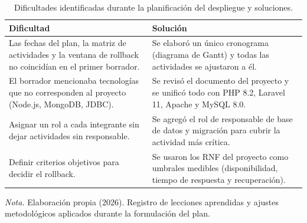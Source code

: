 \begin{table}[H]
  \centering
  \caption{Dificultades identificadas durante la planificación del despliegue y soluciones.}
  \label{tab:despliegue_dificultades}
  \begin{tabularx}{\linewidth}{|>{\raggedright\arraybackslash}X|>{\raggedright\arraybackslash}X|}
    \hline
    \textbf{Dificultad} & \textbf{Solución} \\ \hline
    Las fechas del plan, la matriz de actividades y la ventana de rollback no coincidían en el primer borrador. & Se elaboró un único cronograma (diagrama de Gantt) y todas las actividades se ajustaron a él. \\ \hline
    El borrador mencionaba tecnologías que no corresponden al proyecto (Node.js, MongoDB, JDBC). & Se revisó el documento del proyecto y se unificó todo con PHP 8.2, Laravel 11, Apache y MySQL 8.0. \\ \hline
    Asignar un rol a cada integrante sin dejar actividades sin responsable. & Se agregó el rol de responsable de base de datos y migración para cubrir la actividad más crítica. \\ \hline
    Definir criterios objetivos para decidir el rollback. & Se usaron los RNF del proyecto como umbrales medibles (disponibilidad, tiempo de respuesta y recuperación). \\ \hline
  \end{tabularx}
  \par\vspace{0.2cm}
  {\raggedright \small \emph{Nota.} Elaboración propia (2026). Registro de lecciones aprendidas y ajustes metodológicos aplicados durante la formulación del plan.\par}
\end{table}

